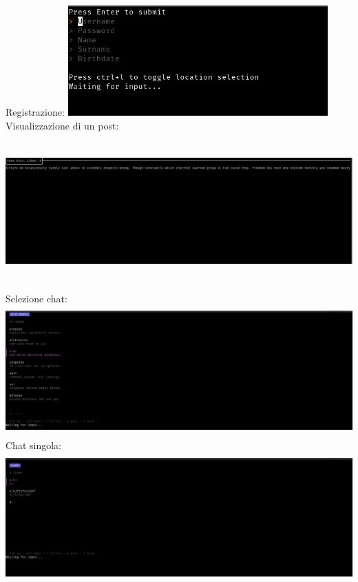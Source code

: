 \documentclass[a4paper,12pt]{report}
\begin{document}
Registrazione:
\newline
\includegraphics[width=10cm]{img/signup.png}
\newline
Visualizzazione di un post:
\newline
\includegraphics[height=6cm]{img/post_view.png}
\newline
Selezione chat:
\newline
\includegraphics[height=5cm]{img/chats_view.png}
Chat singola:
\newline
\includegraphics[height=5cm]{img/single_chat_view.png}
\newline
\end{document}

